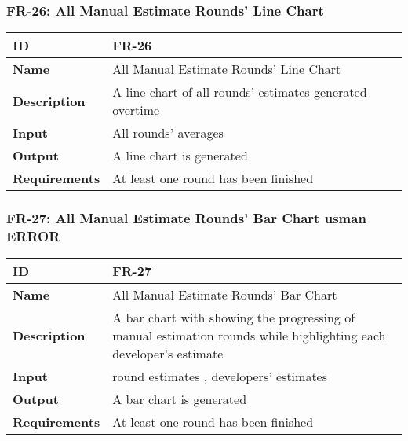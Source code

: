 \subsubsection{FR-26: All Manual Estimate Rounds' Line Chart}
\begin{center}
  \begin{tabularx}{\textwidth}{|l|X|}
      \hline
      \textbf{ID} & FR-26 \\
      \hline
      \textbf{Name} & All Manual Estimate Rounds' Line Chart \\
      \hline
      \textbf{Description} & A line chart of all rounds' estimates generated overtime \\
      \hline
      \textbf{Input} & All rounds' averages \\
      \hline
      \textbf{Output} & A line chart is generated \\
      \hline
      \textbf{Requirements} & At least one round has been finished \\
      \hline
  \end{tabularx}
\end{center}

\subsubsection{FR-27: All Manual Estimate Rounds' Bar Chart usman ERROR}
\begin{center}
  \begin{tabularx}{\textwidth}{|l|X|}
      \hline
      \textbf{ID} & FR-27 \\
      \hline
      \textbf{Name} & All Manual Estimate Rounds' Bar Chart \\
      \hline
      \textbf{Description} & A bar chart with showing the progressing of manual estimation rounds while highlighting each developer's estimate \\
      \hline
      \textbf{Input} & round estimates , developers' estimates \\
      \hline
      \textbf{Output} & A bar chart is generated \\
      \hline
      \textbf{Requirements} & At least one round has been finished \\
      \hline
  \end{tabularx}
\end{center}

